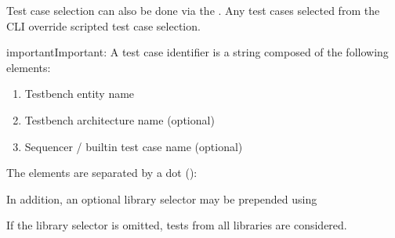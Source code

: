 \documentclass[letterpaper,10pt,english]{sphinxmanual}
\begin{document}
\sphinxAtStartPar
Test case selection can also be done via the {\hyperref[\detokenize{cli::doc}]{}}.
Any test cases selected from the CLI override scripted test case selection.

\begin{sphinxadmonition}{important}{Important:}
\sphinxAtStartPar
A test case identifier is a string composed of the following elements:
\begin{enumerate}
%
\item {} 
\sphinxAtStartPar
Testbench entity name

\item {} 
\sphinxAtStartPar
Testbench architecture name (optional)

\item {} 
\sphinxAtStartPar
Sequencer / built\sphinxhyphen{}in test case name (optional)

\end{enumerate}

\sphinxAtStartPar
The elements are separated by a dot ():

\sphinxAtStartPar
{}

\sphinxAtStartPar
In addition, an optional library selector may be prepended using

\begin{sphinxVerbatim}[commandchars=\\\{\}]
\PYG{p}{[}\PYG{p}{]}\PYG{p}{[}\PYG{p}{[}\PYG{p}{]}\PYG{p}{]}
\end{sphinxVerbatim}

\sphinxAtStartPar
If the library selector is omitted, tests from all libraries are considered.
\end{sphinxadmonition}
\end{document}
